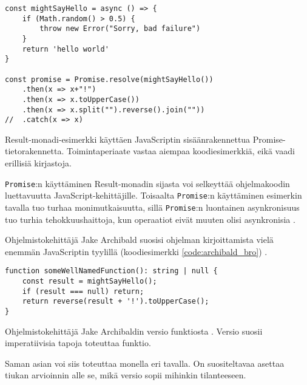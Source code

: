 \begin{code}
    \begin{verbatim}
const mightSayHello = async () => {
    if (Math.random() > 0.5) {
        throw new Error("Sorry, bad failure")
    }
    return 'hello world'
}
    
const promise = Promise.resolve(mightSayHello())
    .then(x => x+"!")
    .then(x => x.toUpperCase())
    .then(x => x.split("").reverse().join(""))
//  .catch(x => x)
\end{verbatim}
    \caption{Result-monadi-esimerkki käyttäen JavaScriptin sisäänrakennettua Promise-tietorakennetta. Toimintaperiaate vastaa aiempaa koodiesimerkkiä, eikä vaadi erillisiä kirjastoja.}
    \label{code:result_monad_example_4}
\end{code}

\texttt{Promise}:n käyttäminen Result-monadin sijasta voi selkeyttää ohjelmakoodin luettavuutta JavaScript-kehittäjille. Toisaalta \texttt{Promise}:n käyttäminen esimerkin tavalla tuo turhaa monimutkaisuutta, sillä \texttt{Promise}:n luontainen asynkronisuus tuo turhia tehokkuushaittoja, kun operaatiot eivät muuten olisi asynkronisia \cite{mdn_promise}.

Ohjelmistokehittäjä Jake Archibald suosisi ohjelman kirjoittamista vielä enemmän JavaScriptin tyylillä (koodiesimerkki \ref{code:archibald_bro}) \cite{pennane_fp_gist} .

\begin{code}
    \begin{verbatim}
function someWellNamedFunction(): string | null {
    const result = mightSayHello();
    if (result === null) return;
    return reverse(result + '!').toUpperCase();
}
\end{verbatim}
    \caption{Ohjelmistokehittäjä Jake Archibaldin versio funktiosta \cite{pennane_fp_gist}. Versio suosii imperatiivisia tapoja toteuttaa funktio.}
    \label{code:archibald_bro}
\end{code}

Saman asian voi siis toteuttaa monella eri tavalla. On suositeltavaa asettaa tiukan arvioinnin alle se, mikä versio sopii mihinkin tilanteeseen.

